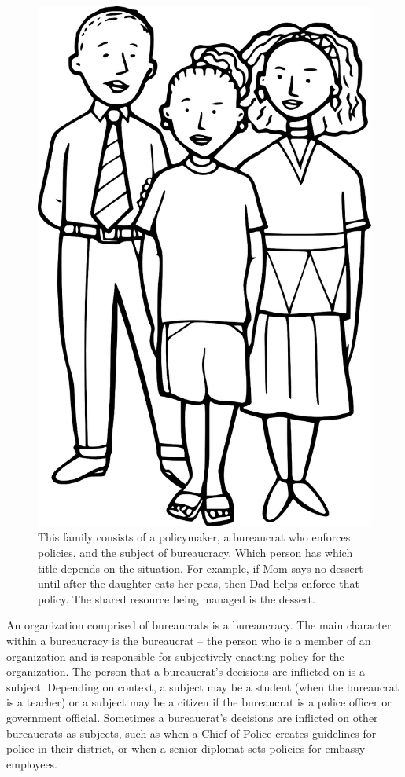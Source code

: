 \begin{figure}
    \centering
    \includegraphics[width=.6\textwidth]{images/family-father-mother-daughter-28725_1280_pixabay.png}
    \caption{This family consists of a policymaker, a bureaucrat who enforces policies, and the subject of bureaucracy. Which person has which title depends on the situation. For example, if Mom says no dessert until after the daughter eats her peas, then Dad helps enforce that policy. The shared resource being managed is the dessert. }
    \label{fig:family-of-bureaucrats}
\end{figure}

An organization comprised of bureaucrats is a \gls{bureaucracy}. \iftoggle{glossaryinmargin}{\marginpar{[Glossary]}}{}
The main character within a bureaucracy is the \gls{bureaucrat} -- the person who is a member of an organization and is responsible for subjectively enacting policy for the organization. The person that a bureaucrat's decisions are inflicted on is a \gls{subject}.  Depending on context, a subject may be a student (when the bureaucrat is a teacher)
or a subject may be a citizen if the bureaucrat is a police officer 
or government official. Sometimes a bureaucrat's decisions are inflicted on other bureaucrats-as-subjects, such as when a Chief of Police creates guidelines for police in their district, or when a senior diplomat sets policies for embassy employees. 


